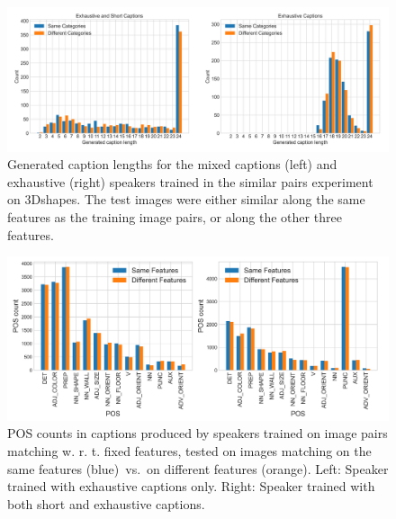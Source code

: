\begin{figure}[h]
	\centering
	\includegraphics[width=\linewidth]{images/3dshapes_exh_short_similar_sameTest_diffTest_length_counts.png}
	\caption{Generated caption lengths for the mixed captions (left) and exhaustive (right) speakers trained in the similar pairs experiment on 3Dshapes. The test images were either similar along the same features as the training image pairs, or along the other three features.}
	\label{fig:3dshapes_exh_short_same_diff_lengths}
\end{figure}

\begin{figure}[h]
	\centering
	\includegraphics[width=\linewidth]{images/3dshapes_similarFixedPairs_exh_vs_short_sameTest_vs_diffTest_POS_counts.png}
	\caption{POS counts in captions produced by speakers trained on image pairs matching w. r. t. fixed features, tested on images matching on the same features (blue)~vs.~on different features (orange). Left: Speaker trained with exhaustive captions only. Right: Speaker trained with both short and exhaustive captions.}
	\label{fig:3dshapes_exh_short_same_diff_POS}
\end{figure}

